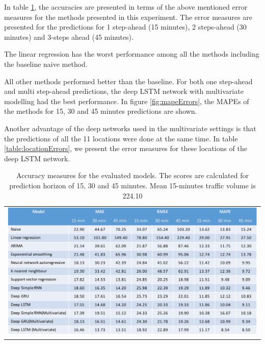 
In table \ref{table:accuracyScores}, the accuracies are presented in terms of the above mentioned
error measures for the methods presented in this experiment. The error measures are presented for
the predictions for 1 step-ahead (15 minutes), 2 steps-ahead (30 minutes) and 3-steps ahead (45 minutes).

The linear regression has the worst performance among all the methods including the baseline naive
method.

All other methods performed better than the baseline. For both one step-ahead and multi
step-ahead predictions, the deep LSTM network with multivariate modelling had the best performance.
In figure \ref{fig:mapeErrors}, the MAPEs of the methods for 15, 30 and 45 minutes predictions
are shown.

Another advantage of the deep networks used in the multivariate settings is that the predictions of
all the 11 locations were done at the same time. In table \ref{table:locationErrors}, we present the
error measures for these locations of the deep LSTM network.

\begin{table}
    \begin{tabular}{c}
        \includegraphics[width=\textwidth,height=\textheight,keepaspectratio]{Figures/errors-table.pdf}
    \end{tabular}
    \caption[Model comparisons]{Accuracy measures for the evaluated models. The scores are
    calculated for prediction horizon of 15, 30 and 45 minutes. Mean 15-minutes traffic
    volume is 224.10}
    \label{table:accuracyScores}
\end{table}

